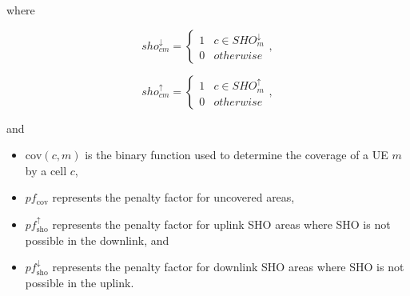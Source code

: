 
\noindent where 

\begin{equation}
sho_{cm}^{\downarrow}=\begin{cases}
1 & c\in SHO_{m}^{\downarrow}\\
0 & otherwise
\end{cases},
\end{equation}


\begin{equation}
sho_{cm}^{\uparrow}=\begin{cases}
1 & c\in SHO_{m}^{\uparrow}\\
0 & otherwise
\end{cases},
\end{equation}


\noindent and
\begin{itemize}
\item $\mathrm{cov}(c,m)$ is the binary function used to determine the
coverage of a UE $m$ by a cell $c$,
\item $pf_{\mathrm{cov}}$ represents the penalty factor for uncovered areas,
\item $pf_{\mathrm{sho}}^{\uparrow}$ represents the penalty factor for
uplink SHO areas where SHO is not possible in the downlink, and
\item $pf_{\mathrm{sho}}^{\downarrow}$ represents the penalty factor for
downlink SHO areas where SHO is not possible in the uplink.
\end{itemize}
\bigskip{}


